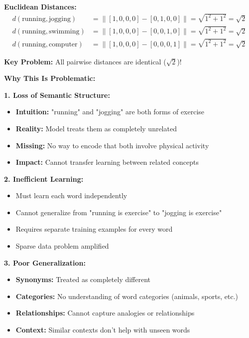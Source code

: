 \documentclass[12pt]{article}
\begin{document}
\begin{enumerate}[(a)]
{    \textbf{Euclidean Distances:}
    \begin{align}
    d(\text{running}, \text{jogging}) &= \|[1,0,0,0] - [0,1,0,0]\| = \sqrt{1^2 + 1^2} = \sqrt{2} \\
    d(\text{running}, \text{swimming}) &= \|[1,0,0,0] - [0,0,1,0]\| = \sqrt{1^2 + 1^2} = \sqrt{2} \\
    d(\text{running}, \text{computer}) &= \|[1,0,0,0] - [0,0,0,1]\| = \sqrt{1^2 + 1^2} = \sqrt{2}
    \end{align}
    
    \textbf{Key Problem:} All pairwise distances are identical ($\sqrt{2}$)!
    
    \textbf{Why This Is Problematic:}
    
    \textbf{1. Loss of Semantic Structure:}
    \begin{itemize}
        \item \textbf{Intuition:} "running" and "jogging" are both forms of exercise
        \item \textbf{Reality:} Model treats them as completely unrelated
        \item \textbf{Missing:} No way to encode that both involve physical activity
        \item \textbf{Impact:} Cannot transfer learning between related concepts
    \end{itemize}
    
    \textbf{2. Inefficient Learning:}
    \begin{itemize}
        \item Must learn each word independently
        \item Cannot generalize from "running is exercise" to "jogging is exercise"
        \item Requires separate training examples for every word
        \item Sparse data problem amplified
    \end{itemize}
    
    \textbf{3. Poor Generalization:}
    \begin{itemize}
        \item \textbf{Synonyms:} Treated as completely different
        \item \textbf{Categories:} No understanding of word categories (animals, sports, etc.)
        \item \textbf{Relationships:} Cannot capture analogies or relationships
        \item \textbf{Context:} Similar contexts don't help with unseen words
    \end{itemize}
    
}
\end{enumerate}
\end{document}
